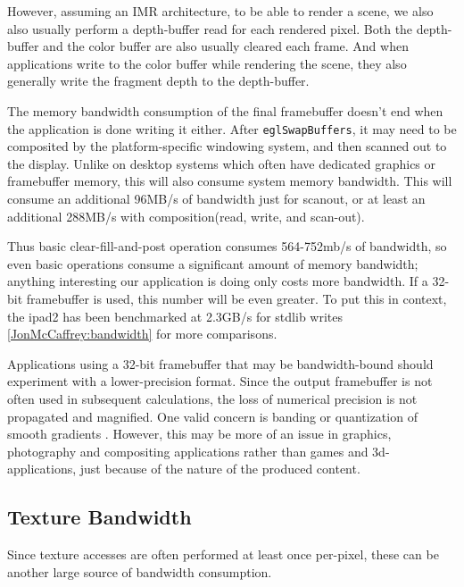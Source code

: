  

However, assuming an IMR architecture, to be able to render a scene, we also
also usually perform a depth-buffer read for each rendered pixel.  Both the
depth-buffer and the color buffer are also usually cleared each frame.  And
when applications write to the color buffer while rendering the scene, they
also generally write the fragment depth to the depth-buffer.

The memory bandwidth consumption of the final framebuffer doesn't end when the
application is done writing it either.  After \texttt{eglSwapBuffers}, it may
need to be composited by the platform-specific windowing system, and then
scanned out to the display.  Unlike on desktop systems which often have
dedicated graphics or framebuffer memory, this will also consume system memory
bandwidth.  This will consume an additional 96MB/s of bandwidth just for
scanout, or at least an additional 288MB/s with composition(read, write, and
scan-out).


Thus basic clear-fill-and-post operation consumes 564-752mb/s of bandwidth, so
even basic operations consume a significant amount of memory bandwidth;
anything interesting our application is doing only costs more bandwidth.  If a
32-bit framebuffer is used, this number will be even greater.  To put this in
context, the ipad2 has been benchmarked at 2.3GB/s for stdlib writes
\cite{Shimpi11}  \ref{JonMcCaffrey:bandwidth} for more comparisons.


Applications using a 32-bit framebuffer that may be bandwidth-bound should
experiment with a lower-precision format.  Since the output framebuffer is not
often used in subsequent calculations, the loss of numerical precision is not
propagated and magnified.  One valid concern is banding or quantization of
smooth gradients \cite{Guy10}.  However, this may be more of an issue
in graphics, photography and compositing applications rather than games and
3d-applications, just because of the nature of the produced content.

\subsection{Texture Bandwidth}\label{JonMcCaffrey-Texture-Bandwidth} Since
texture accesses are often performed at least once per-pixel, these can be
another large source of bandwidth consumption.

